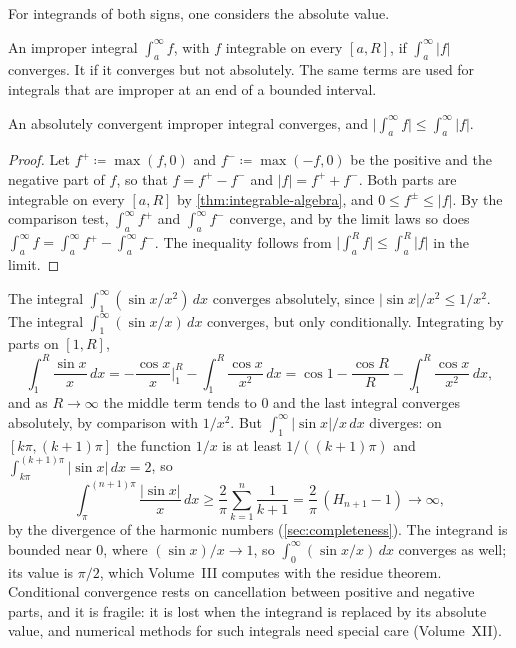 For integrands of both signs, one considers the absolute value.

\begin{definition}
\label{def:absolute-convergence}
An improper integral $\int_a^\infty f$, with $f$ integrable on every $[a,R]$,  if $\int_a^\infty|f|$ converges. It  if it converges but not absolutely. The same terms are used for integrals that are improper at an end of a bounded interval.
\end{definition}

\begin{theorem}
\label{thm:absolute-convergence}
An absolutely convergent improper integral converges, and $\bigl|\int_a^\infty f\bigr|\le\int_a^\infty|f|$.
\end{theorem}

\begin{proof}
Let $f^+\coloneqq\max(f,0)$ and $f^-\coloneqq\max(-f,0)$ be the positive and the negative part of $f$, so that $f=f^+-f^-$ and $|f|=f^++f^-$. Both parts are integrable on every $[a,R]$ by \cref{thm:integrable-algebra}, and $0\le f^\pm\le|f|$. By the comparison test, $\int_a^\infty f^+$ and $\int_a^\infty f^-$ converge, and by the limit laws so does $\int_a^\infty f=\int_a^\infty f^+-\int_a^\infty f^-$. The inequality follows from $\bigl|\int_a^Rf\bigr|\le\int_a^R|f|$ in the limit.
\end{proof}

The integral $\int_1^\infty(\sin x/x^2)\,dx$ converges absolutely, since $|\sin x|/x^2\le1/x^2$. The integral $\int_1^\infty(\sin x/x)\,dx$ converges, but only conditionally. Integrating by parts on $[1,R]$,
\[
\int_1^R\frac{\sin x}x\,dx=-\frac{\cos x}x\Big|_1^R-\int_1^R\frac{\cos x}{x^2}\,dx=\cos1-\frac{\cos R}R-\int_1^R\frac{\cos x}{x^2}\,dx ,
\]
and as $R\to\infty$ the middle term tends to $0$ and the last integral converges absolutely, by comparison with $1/x^2$. But $\int_1^\infty|\sin x|/x\,dx$ diverges: on $[k\pi,(k+1)\pi]$ the function $1/x$ is at least $1/((k+1)\pi)$ and $\int_{k\pi}^{(k+1)\pi}|\sin x|\,dx=2$, so
\[
\int_\pi^{(n+1)\pi}\frac{|\sin x|}x\,dx\ge\frac2\pi\sum_{k=1}^n\frac1{k+1}=\frac2\pi\,(H_{n+1}-1)\to\infty ,
\]
by the divergence of the harmonic numbers (\cref{sec:completeness}). The integrand is bounded near $0$, where $(\sin x)/x\to1$, so $\int_0^\infty(\sin x/x)\,dx$ converges as well; its value is $\pi/2$, which Volume~III computes with the residue theorem. Conditional convergence rests on cancellation between positive and negative parts, and it is fragile: it is lost when the integrand is replaced by its absolute value, and numerical methods for such integrals need special care (Volume~XII).

